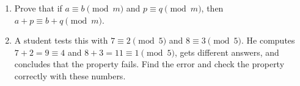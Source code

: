 \begin{enumerate}
\item[(a)] Prove that if $a\equiv b\pmod m$ and $p\equiv q\pmod m$, then $a+p\equiv b+q\pmod m$.
\item[(b)] A student tests this with $7\equiv2\pmod5$ and $8\equiv3\pmod5$. He computes $7+2=9\equiv4$ and $8+3=11\equiv1\pmod5$, gets different answers, and concludes that the property fails. Find the error and check the property correctly with these numbers.
\end{enumerate}
